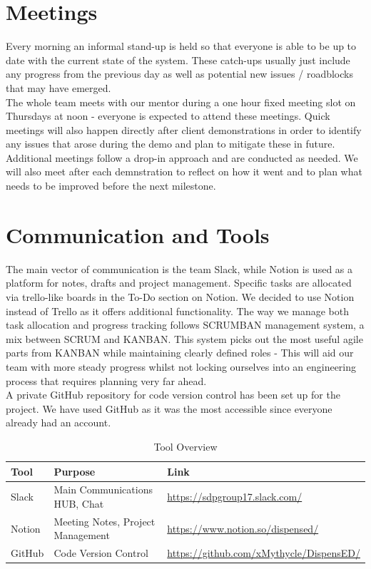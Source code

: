 \documentclass[a4paper,10pt,DIV10,openright,openbib]{scrreprt}
\let\oldbibliography%
\renewcommand{}[1]{{%
  \let\chapter\section%
  \oldbibliography{#1}}}%
\begin{document}
\section{Meetings}
Every morning an informal stand-up is held so that everyone is able to be up to
date with the current state of the system. These catch-ups usually just include
any progress from the previous day as well as potential new issues / roadblocks
that may have emerged.\\
The whole team meets with our mentor during a one hour fixed meeting slot on
Thursdays at noon - everyone is expected to attend these meetings. Quick
meetings will also happen directly after client demonstrations in order to
identify any issues that arose during the demo and plan to mitigate these in future.
Additional meetings follow a drop-in approach and are conducted as needed.
We will also meet after each demnstration to reflect on how it went and to plan
what needs to be improved before the next milestone.


\section{Communication and Tools}
The main vector of communication is the team Slack, while Notion is used as a platform for notes,
drafts and project management. Specific tasks are allocated via trello-like boards in
the To-Do section on Notion. We decided to use Notion instead of Trello as it
offers additional functionality. The way we manage both task allocation and
progress tracking follows SCRUMBAN management system, a mix between SCRUM
and KANBAN. This system picks out the most useful agile parts from KANBAN while
maintaining clearly defined roles - This will aid our team with more
steady progress whilst not locking ourselves into an engineering process that
requires planning very far ahead. \\
A private GitHub repository for code version control has been set
up for the project. We have used GitHub as it was the most accessible since
everyone already had an account.\\
\begin{table}[h]
\centering
\caption{Tool Overview}
\begin{tabular}{@{}lll@{}}
\toprule
Tool   & Purpose                                   & Link     \\ \midrule
Slack  & Main Communications HUB, Chat             & \url{https://sdpgroup17.slack.com/} \\
Notion & Meeting Notes, Project Management & \url{https://www.notion.so/dispensed/} \\
GitHub & Code Version Control                      & \url{https://github.com/xMythycle/DispensED/} \\ \bottomrule
\end{tabular}
\end{table}




%




\end{document}

